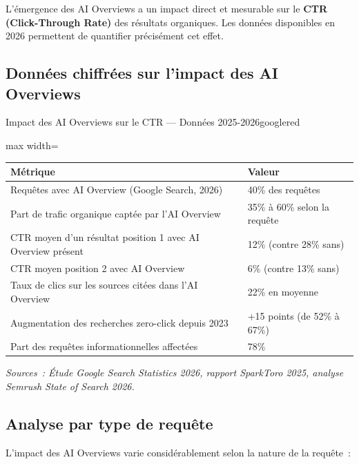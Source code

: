 \documentclass[12pt,a4paper,twoside]{report}
\newcommand{\keyword}[1]{\textbf{\textcolor{googleblue}{#1}}}
\begin{document}
L'émergence des AI Overviews a un impact direct et mesurable sur le \keyword{CTR (Click-Through Rate)} des résultats organiques. Les données disponibles en 2026 permettent de quantifier précisément cet effet.

\subsection{Données chiffrées sur l'impact des AI Overviews}

\begin{mybox}{Impact des AI Overviews sur le CTR — Données 2025-2026}{googlered}
\begin{adjustbox}{max width=\textwidth}
\begin{tabular}{ll}
    \toprule
    \textbf{Métrique} & \textbf{Valeur} \\
    \midrule
    Requêtes avec AI Overview (Google Search, 2026) & 40\% des requêtes \\
    Part de trafic organique captée par l'AI Overview & 35\% à 60\% selon la requête \\
    CTR moyen d'un résultat position 1 avec AI Overview présent & 12\% (contre 28\% sans) \\
    CTR moyen position 2 avec AI Overview & 6\% (contre 13\% sans) \\
    Taux de clics sur les sources citées dans l'AI Overview & 22\% en moyenne \\
    Augmentation des recherches zero-click depuis 2023 & +15 points (de 52\% à 67\%) \\
    Part des requêtes informationnelles affectées & 78\% \\
    \bottomrule
\end{tabular}
\end{adjustbox}
\end{mybox}

\textit{Sources~: Étude Google Search Statistics 2026, rapport SparkToro 2025, analyse Semrush State of Search 2026.}

\subsection{Analyse par type de requête}

L'impact des AI Overviews varie considérablement selon la nature de la requête~:
\end{document}
